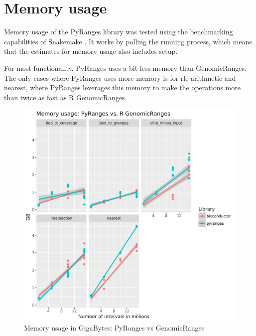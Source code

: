 \documentclass[10pt,letterpaper]{article}
\begin{document}
\section*{Memory usage}

Memory usage of the PyRanges library was tested using the benchmarking
capabilities of Snakemake \cite{doi:10.1093/bioinformatics/bty350}. It works by
polling the running process, which means that the estimates for memory usage
also includes setup.

For most functionality, PyRanges uses a bit less memory than GenomicRanges. The
only cases where PyRanges uses more memory is for rle arithmetic and nearest,
where PyRanges leverages this memory to make the operations more than twice as
fast as R GenomicRanges.

\begin{figure}
\includegraphics[width=1\textwidth]{graphs/memory.png}
\caption{Memory usage in GigaBytes: PyRanges vs GenomicRanges} %
\label{fig1} %
\end{figure} %
\end{document}
